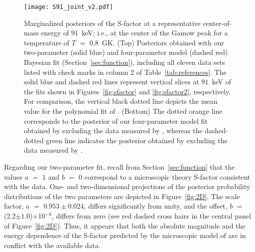 \documentclass[twocolumn]{aastex63}
\begin{document}
%

\begin{figure}
\texttt{[image: S91\_joint\_v2.pdf]}
\caption{Marginalized posteriors of the S-factor at a representative center-of-mass energy of $91$~keV; i.e., at the center of the Gamow peak for a temperature of $T$ $=$ $0.8$~GK. (Top) Posteriors obtained with our two-parameter (solid blue) and four-parameter model (dashed red) Bayesian fit (Section~\ref{sec:function}), including all eleven data sets listed with check marks in column 2 of Table~\ref{tab:references}. The solid blue and dashed red lines represent vertical slices at $91$~keV of the fits shown in Figures~\ref{fig:sfactor} and \ref{fig:sfactor2}, respectively. For comparison, the vertical black dotted line depicts the mean value for the polynomial fit of \citet{Pis21}. (Bottom) The dotted orange line corresponds to the posterior of our four-parameter model fit obtained by excluding the data measured by \citet{Mossa20}, whereas the dashed-dotted green line indicates the posterior obtained by excluding the data measured by \citet{War63,Turkat21}.} 
\label{fig:sfac91}
\end{figure}

Regarding our two-parameter fit, recall from Section~\ref{sec:function} that the values $a$ $=$ $1$ and $b$ $=$ $0$ correspond to a microscopic theory S-factor consistent with the data. One- and two-dimensional projections of the posterior probability distributions of the two parameters are depicted in Figure~\ref{fig:2D}. The scale factor, $a$ $=$ $0.953\pm0.024$, differs significantly from unity, and the offset, $b$ $=$ (2.2$\pm1.0$)$\times$10$^{-8}$, differs from zero (see red dashed cross hairs in the central panel of Figure~\ref{fig:2D}). Thus, it appears that both the absolute magnitude and the energy dependence of the S-factor predicted by the microscopic model of \citet{marcucci05} are in conflict with the available data.
\end{document}
